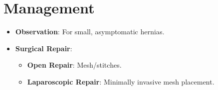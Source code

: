\documentclass{article}
\begin{document}
\section*{Management}
\begin{itemize}[noitemsep]
  \item \textbf{Observation}: For small, asymptomatic hernias.
  \item \textbf{Surgical Repair}:
    \begin{itemize}
        \item \textbf{Open Repair}: Mesh/stitches.
        \item \textbf{Laparoscopic Repair}: Minimally invasive mesh placement.
    \end{itemize}
\end{itemize}
\end{document}
